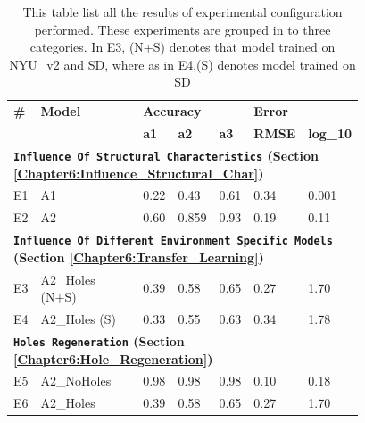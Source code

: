 \bgroup
\def\arraystretch{1.35}%
\begin{table}[h]
\begin{tabular}{p{0.05\linewidth}p{0.3\linewidth}p{0.1\linewidth}p{0.1\linewidth}p{0.08\linewidth}p{0.08\linewidth}p{0.07\linewidth}}
\hline
\textbf{\#} & \textbf{Model} & \multicolumn{3}{l}{\textbf{Accuracy}} & \multicolumn{2}{l}{\textbf{Error}} \\ \cline{3-7} 
                    &                        & \textbf{a1}       & \textbf{a2}       & \textbf{a3}      & \textbf{RMSE}         & \textbf{log\_10}      \\ \hline\hline
\multicolumn{7}{l}{\textbf{\texttt{Influence Of Structural Characteristics} (Section \ref{Chapter6:Influence_Structural_Char})}}                                            \\ \hline
E1                 &  A1  & 0.22         & 0.43          &  0.61       & 0.34            &   0.001           \\ \hline
E2                  & A2  &    0.60  & 0.859 & 0.93       &   0.19          &0.11              \\ \hline 
\multicolumn{7}{l}{\textbf{\texttt{Influence Of Different Environment Specific Models} (Section \ref{Chapter6:Transfer_Learning})}}                                                                   \\ \hline
{E3}                  & {A2\_Holes} (N+S)              & 0.39   & 0.58   & 0.65  & 0.27      & 1.70       \\ \hline
{E4}                  & {A2\_Holes} (S) & 0.33   & 0.55   & 0.63  & 0.34      & 1.78       \\ \hline
\multicolumn{7}{l}{\textbf{\texttt{Holes Regeneration} (Section \ref{Chapter6:Hole_Regeneration})}}                                                       \\ \hline
{E5}                  & {A2\_NoHoles}            & 0.98   & 0.98   & 0.98  & 0.10       & 0.18        \\ \hline
{E6}                  & {A2\_Holes}              & 0.39   & 0.58   & 0.65  & 0.27      & 1.70       \\ \hline
\end{tabular}

\caption{This table list all the results of experimental configuration performed. These experiments are grouped in to three categories. In E3, (N+S) denotes that model trained on NYU\_v2 and SD, where as in E4,(S) denotes model trained on SD}
\label{table:Results_main}
\end{table}
\egroup

